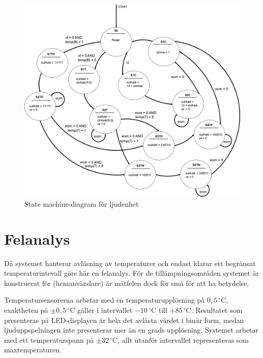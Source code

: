 \documentclass[a4paper,11pt]{article}
\begin{document}
	\begin{figure}[H]
	  \centering
	      \includegraphics[scale=0.18, angle=0]{SoundStateMachineDiagram.png}
	  	\caption{State machine-diagram för ljudenhet}
		\label{fig:SoundSM}
	\end{figure}

\pagebreak

\section{Felanalys}

Då systemet hanterar avläsning av temperaturer och endast klarar ett begränsat temperaturintevall
görs här en felanalys. För de tillämpningsområden systemet är konstruerat för (hemanvändare) 
är mätfelen dock för små för att ha betydelse.

Temperatursensorerna arbetar med en temperaturupplösning på $0,5\,^{\circ}\mathrm{C}$, exaktheten på $\pm 0,5\,^{\circ}\mathrm{C}$ gäller i intervallet $-10\,^{\circ}\mathrm{C}$ till $+85\,^{\circ}\mathrm{C}$. Resultatet som presenteras på LED-displayen är hela det avlästa värdet i binär form, medan ljuduppspelningen inte presenterar mer än en grads upplösning,
Systemet arbetar med ett temperaturspann på $\pm 32\,^{\circ}\mathrm{C}$, allt utanför intervallet representeras som maxtemperaturen.

\pagebreak

	\appendix
	\renewcommand{\appendixpagename}{Appendix}
	\appendixpage
	\renewcommand{\appendixtocname}{Appendix}
\end{document}
